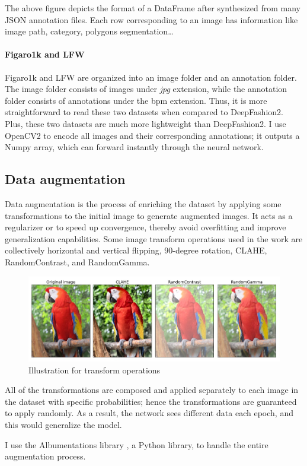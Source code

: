 The above figure depicts the format of a DataFrame after synthesized from many JSON annotation files. Each row corresponding to an image has information like image path, category, polygons segmentation… \par

\paragraph{Figaro1k and LFW}
Figaro1k and LFW are organized into an image folder and an annotation folder. The image folder consists of images under \emph{jpg} extension, while the annotation folder consists of annotations under the bpm extension. Thus, it is more straightforward to read these two datasets when compared to DeepFashion2. Plus, these two datasets are much more lightweight than DeepFashion2. I use OpenCV2 to encode all images and their corresponding annotations; it outputs a Numpy array, which can forward instantly through the neural network. \par

\subsection{Data augmentation}
Data augmentation is the process of enriching the dataset by applying some transformations to the initial image to generate augmented images. It acts as a regularizer or to speed up convergence, thereby avoid overfitting and improve generalization capabilities. Some image transform operations used in the work are collectively horizontal and vertical flipping, 90-degree rotation, CLAHE, RandomContrast, and RandomGamma. \par

\begin{figure}[H]
    \centering
    \includegraphics{chapter4/image/augmentation.png}
    \caption{Illustration for transform operations}
    \label{fig:augmentation}
\end{figure}

All of the transformations are composed and applied separately to each image in the dataset with specific probabilities; hence the transformations are guaranteed to apply randomly. As a result, the network sees different data each epoch, and this would generalize the model. \par
I use the Albumentations library \cite{albumentations}, a Python library, to handle the entire augmentation process.



